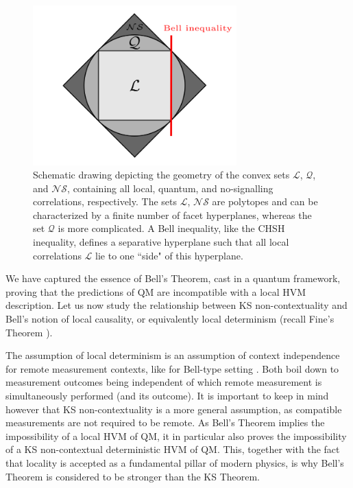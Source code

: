 \begin{figure}
    \centering
    \includegraphics[width=0.7\textwidth]{images/correlations.png}
    \caption{Schematic drawing depicting the geometry of the convex sets $\mathcal{L}$, $\mathcal{Q}$, and $\mathcal{NS}$, containing all local, quantum, and no-signalling correlations, respectively. The sets $\mathcal{L}$, $\mathcal{NS}$ are polytopes and can be characterized by a finite number of facet hyperplanes, whereas the set $\mathcal{Q}$ is more complicated. A Bell inequality, like the CHSH inequality, defines a separative hyperplane such that all local correlations $\mathcal{L}$ lie to one ``side" of this hyperplane.}
    \label{fig:correlations}
\end{figure}

We have captured the essence of Bell's Theorem, cast in a quantum framework, proving that the predictions of QM are incompatible with a local HVM description. Let us now study the relationship between KS non-contextuality and Bell's notion of local causality, or equivalently local determinism (recall Fine's Theorem \cite{Fine1982}). 

The assumption of local determinism is an assumption of context independence for remote measurement contexts, like for Bell-type setting \cite{Spekkens2012}. Both boil down to measurement outcomes being independent of which remote measurement is simultaneously performed (and its outcome). It is important to keep in mind however that KS non-contextuality is a more general assumption, as compatible measurements are not required to be remote.
As Bell's Theorem implies the impossibility of a local HVM of QM, it in particular also proves the impossibility of a KS non-contextual deterministic HVM of QM. This, together with the fact that locality is accepted as a fundamental pillar of modern physics, is why Bell's Theorem is considered to be stronger than the KS Theorem. 

